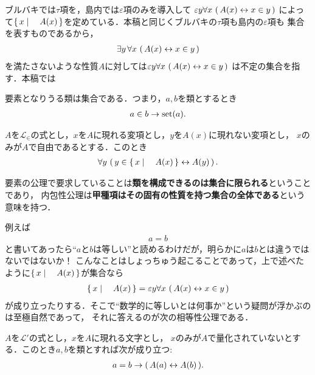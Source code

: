 	ブルバキでは$\tau$項を，島内では$\varepsilon$項のみを導入して
	$\varepsilon y \forall x\, \left(\, A(x) \leftrightarrow x \in y\, \right)$
	によって$\left\{\, x \mid \quad A(x)\, \right\}$を定めている．本稿と同じくブルバキの$\tau$項も島内の$\varepsilon$項も
	集合を表すものであるから，
	\begin{align}
		\exists y\, \forall x\, \left(\, A(x) \leftrightarrow x \in y\, \right)
	\end{align}
	を満たさないような性質$A$に対しては$\varepsilon y \forall x\, \left(\, A(x) \leftrightarrow x \in y\, \right)$
	は不定の集合を指す．本稿では
	
	\begin{screen}
		\begin{axm}[要素の公理]
			要素となりうる類は集合である．つまり，$a,b$を類とするとき
			\begin{align}
				a \in b \rightarrow \operatorname*{set} (a).
			\end{align}
		\end{axm}
	\end{screen}
	
	\begin{screen}
		\begin{axm}[内包性公理] 
			$A$を$\mathcal{L}_{\in}$の式とし，$x$を$A$に現れる変項とし，$y$を$A(x)$に現れない変項とし，
			$x$のみが$A$で自由であるとする．このとき
			\begin{align}
				\forall y\, \left(\, y \in \left\{\, x \mid \quad A(x)\, \right\} \leftrightarrow A(y)\, \right).
			\end{align}
		\end{axm}
	\end{screen}
	
	要素の公理で要求していることは{\bf 類を構成できるのは集合に限られる}ということであり，
	内包性公理は{\bf 甲種項はその固有の性質を持つ集合の全体である}という意味を持つ．
	
	
	例えば
	\begin{align}
		a = b
	\end{align}
	と書いてあったら``$a$と$b$は等しい''と読めるわけだが，明らかに$a$は$b$とは違うではないではないか！
	こんなことはしょっちゅう起こることであって，上で述べたように$\left\{\, x \mid \quad A(x)\, \right\}$が集合なら
	\begin{align}
		\left\{\, x \mid \quad A(x)\, \right\} = \varepsilon y \forall x\, \left(\, A(x) \leftrightarrow x \in y\, \right)
	\end{align}
	が成り立ったりする．そこで``数学的に等しいとは何事か''という疑問が浮かぶのは至極自然であって，
	それに答えるのが次の相等性公理である．
	
	\begin{screen}
		\begin{axm}[相等性公理]
			$A$を$\mathcal{L}'$の式とし，$x$を$A$に現れる文字とし，
			$x$のみが$A$で量化されていないとする．このとき$a,b$を類とすれば次が成り立つ:
			\begin{align}
				a = b \rightarrow (\, A(a) \leftrightarrow A(b)\, ).
			\end{align}
		\end{axm}
	\end{screen}
	
